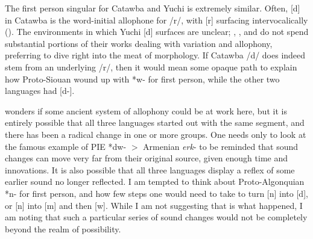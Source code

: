 \documentclass[output=paper]{LSP/langsci}
\begin{document}
The first person singular for Catawba and Yuchi is extremely similar. Often, [d] in Catawba is the word-initial allophone for /r/, with [r] surfacing intervocalically (\citealt{Rudes2007}). The environments in which Yuchi [d] surfaces are unclear; \citet{Gatschet1885}, \citet{Wagner1934}, and \citet{Linn2000} do not spend substantial portions of their works dealing with variation and allophony, preferring to dive right into the meat of morphology. If Catawba /d/ does indeed stem from an underlying /r/, then it would mean some opaque path to explain how Proto-Siouan wound up with *w- for first person, while the other two languages had [d-]. 

\citet{Rankin1998scy} wonders if some ancient system of allophony could be at work here, but it is entirely possible that all three languages started out with the same segment, and there has been a radical change in one or more groups. One needs only to look at the famous example of PIE *dw- $>$ Armenian \emph{erk}- to be reminded that sound changes can move very far from their original source, given enough time and innovations. It is also possible that all three languages display a reflex of some earlier sound no longer reflected. I am tempted to think about Proto-Algonquian *n- for first person, and how few steps one would need to take to turn [n] into [d], or [n] into [m] and then [w]. While I am not suggesting that is what happened, I am noting that such a particular series of sound changes would not be completely beyond the realm of possibility.
\end{document}
